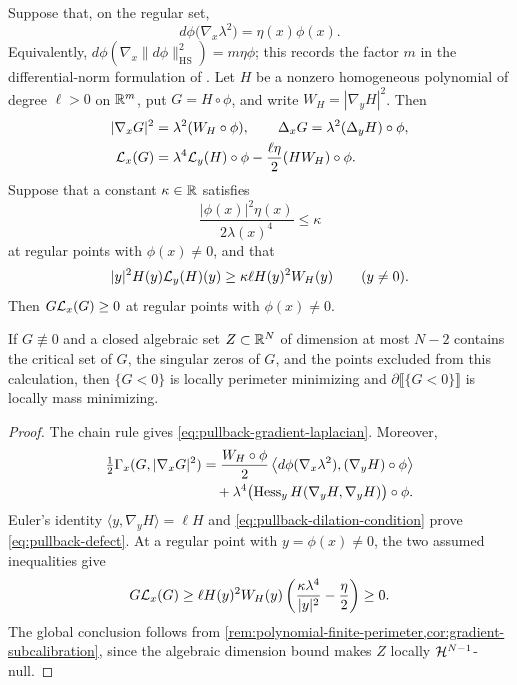 \begin{proposition}
\label{prop:pullback-subcalibration}
Suppose that, on the regular set,
\begin{equation}\label{eq:pullback-dilation-condition}
 d\phi\bigl(\nabla_x\lambda^2\bigr)=\eta(x)\phi(x).
\end{equation}
Equivalently,
\(d\phi(\nabla_x\|d\phi\|_{\mathrm{HS}}^2)=m\eta\phi\);
this records the factor \(m\) in the differential-norm formulation
of \cite[Definition~5.1.1(1)]{RiedlerThesis25}.
Let \(H\) be a nonzero homogeneous polynomial of degree \(\ell>0\)
on \(\mathbb R^m\), put \(G=H\circ\phi\), and write
\(W_H=|\nabla_yH|^2\).  Then
\begin{align}
 |\nabla_xG|^2&=\lambda^2(W_H\circ\phi),\qquad
 \Delta_xG=\lambda^2(\Delta_yH)\circ\phi,
 \label{eq:pullback-gradient-laplacian}\\
 \mathcal L_x(G)&=\lambda^4\mathcal L_y(H)\circ\phi
       -\frac{\ell\eta}{2}(H W_H)\circ\phi.
 \label{eq:pullback-defect}
\end{align}
Suppose that a constant \(\kappa\in\mathbb R\) satisfies
\begin{equation}\label{eq:pullback-kappa-bound}
 \frac{|\phi(x)|^2\eta(x)}{2\lambda(x)^4}\leq\kappa
\end{equation}
at regular points with \(\phi(x)\ne0\), and that
\begin{equation}\label{eq:pullback-target-sign}
 |y|^2H(y)\mathcal L_y(H)(y)
 \geq\kappa\ell H(y)^2W_H(y)
 \qquad(y\ne0).
\end{equation}
Then \(G\mathcal L_x(G)\geq0\) at regular points with \(\phi(x)\ne0\).

If \(G\not\equiv0\) and a closed algebraic set \(Z\subset\mathbb R^N\)
of dimension at most \(N-2\) contains the critical set of \(G\),
the singular zeros of \(G\), and the points excluded from this
calculation, then \(\{G<0\}\) is locally perimeter minimizing and
\(\partial\llbracket\{G<0\}\rrbracket\) is locally mass minimizing.
\end{proposition}

\begin{proof}
The chain rule gives \eqref{eq:pullback-gradient-laplacian}.  Moreover,
\begin{align*}
 \tfrac12\Gamma_x(G,|\nabla_xG|^2)
 &=\frac{W_H\circ\phi}{2}
   \left\langle d\phi(\nabla_x\lambda^2),
                   (\nabla_yH)\circ\phi\right\rangle\\
 &\quad+\lambda^4\bigl(\operatorname{Hess}_yH(\nabla_yH,\nabla_yH)\bigr)\circ\phi.
\end{align*}
Euler's identity \(\langle y,\nabla_yH\rangle=\ell H\)
and \eqref{eq:pullback-dilation-condition} prove
\eqref{eq:pullback-defect}.  At a regular point with
\(y=\phi(x)\ne0\), the two assumed inequalities give
\[
 G\mathcal L_x(G)
 \geq\ell H(y)^2W_H(y)
       \left(\frac{\kappa\lambda^4}{|y|^2}
                    -\frac{\eta}{2}\right)\geq0.
\]
The global conclusion follows from
\cref{rem:polynomial-finite-perimeter,cor:gradient-subcalibration},
since the algebraic dimension bound makes \(Z\) locally
\(\mathcal H^{N-1}\)-null.
\end{proof}

